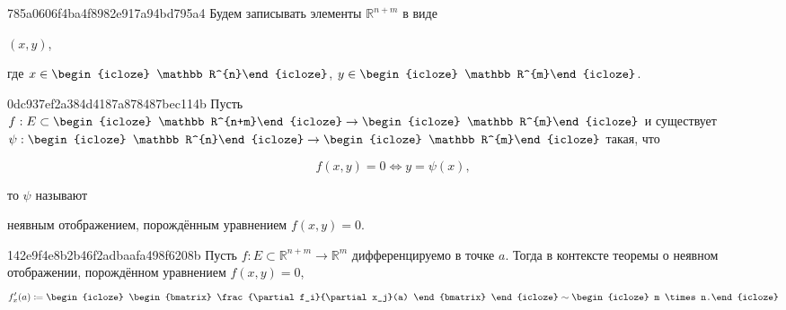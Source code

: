 \begin{note}{785a0606f4ba4f8982e917a94bd795a4}
    Будем записывать элементы \({ \mathbb R^{n+m} }\) в виде \begin{icloze}{1}\({ (x, y) }\),\end{icloze} где \({ x \in \begin{icloze}{2}\mathbb R^{n}\end{icloze} }\), \({ y \in \begin{icloze}{2}\mathbb R^{m}\end{icloze} }\).
\end{note}

\begin{note}{0dc937ef2a384d4187a878487bec114b}
    Пусть \({ f : E \subset \begin{icloze}{4}\mathbb R^{n+m}\end{icloze} \to \begin{icloze}{4}\mathbb R^{m}\end{icloze} }\) и существует \({ \psi : \begin{icloze}{3}\mathbb R^{n}\end{icloze} \to \begin{icloze}{3}\mathbb R^{m}\end{icloze} }\) такая, что
    \begin{icloze}{2}
        \[
            f(x, y) = 0 \iff y = \psi(x),
        \]
    \end{icloze}
    то \({ \psi }\) называют \begin{icloze}{1}неявным отображением, порождённым уравнением \({ f(x, y) = 0 }\).\end{icloze}
\end{note}

\begin{note}{142e9f4e8b2b46f2adbaafa498f6208b}
    Пусть \({ f : E \subset \mathbb R^{n + m} \to \mathbb R^{m} }\) дифференцируемо в точке \({ a }\).
    Тогда в контексте теоремы о неявном отображении, порождённом уравнением \({ f(x, y) = 0 }\),
    \[
        f'_{x}(a) \coloneqq
        \begin{icloze}{1}
            \begin{bmatrix}
                \frac{\partial f_i}{\partial x_j}(a)
            \end{bmatrix}
        \end{icloze}
        \sim \begin{icloze}{2}m \times n.\end{icloze}
    \]
\end{note}

